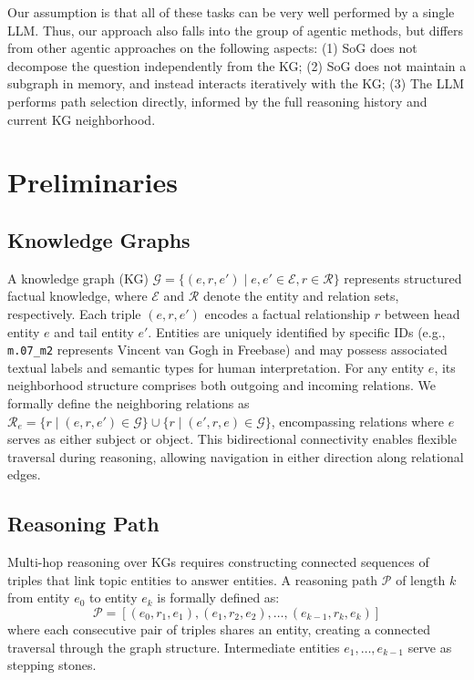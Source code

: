\documentclass[sigconf]{acmart}
\begin{document}
Our assumption is that all of these tasks can be very well performed by a single LLM. Thus, our approach also falls into the group of agentic methods, but differs from other agentic approaches on the following aspects: (1) SoG does not decompose the question independently from the KG; (2) SoG does not maintain a subgraph in memory, and instead interacts iteratively with the KG; (3) The LLM performs path selection directly, informed by the full reasoning history and current KG neighborhood.

\section{Preliminaries}

\subsection{Knowledge Graphs}

A knowledge graph (KG) $\mathcal{G} = \{(e, r, e') \mid e, e' \in \mathcal{E}, r \in \mathcal{R}\}$ represents structured factual knowledge, where $\mathcal{E}$ and $\mathcal{R}$ denote the entity and relation sets, respectively. Each triple $(e, r, e')$ encodes a factual relationship $r$ between head entity $e$ and tail entity $e'$. Entities are uniquely identified by specific IDs (e.g., \texttt{m.07\_m2} represents Vincent van Gogh in Freebase) and may possess associated textual labels and semantic types for human interpretation.
For any entity $e$, its neighborhood structure comprises both outgoing and incoming relations. We formally define the neighboring relations as $\mathcal{R}_e = \{r \mid (e, r, e') \in \mathcal{G}\} \cup \{r \mid (e', r, e) \in \mathcal{G}\}$, encompassing relations where $e$ serves as either subject or object. This bidirectional connectivity enables flexible traversal during reasoning, allowing navigation in either direction along relational edges.

\subsection{Reasoning Path}

Multi-hop reasoning over KGs requires constructing connected sequences of triples that link topic entities to answer entities. A reasoning path $\mathcal{P}$ of length $k$ from entity $e_0$ to entity $e_k$ is formally defined as:
$$\mathcal{P} = [(e_0, r_1, e_1), (e_1, r_2, e_2), \ldots, (e_{k-1}, r_k, e_k)]$$ 
where each consecutive pair of triples shares an entity, creating a connected traversal through the graph structure. Intermediate entities $e_1, \ldots, e_{k-1}$ serve as stepping stones.
\end{document}
